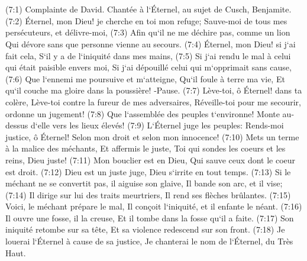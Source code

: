 \chapter{}

\verse (7:1) Complainte de David. Chantée à l`Éternel, au sujet de Cusch, Benjamite. (7:2) Éternel, mon Dieu! je cherche en toi mon refuge; Sauve-moi de tous mes persécuteurs, et délivre-moi, 
\verse (7:3) Afin qu`il ne me déchire pas, comme un lion Qui dévore sans que personne vienne au secours. 
\verse (7:4) Éternel, mon Dieu! si j`ai fait cela, S`il y a de l`iniquité dans mes mains, 
\verse (7:5) Si j`ai rendu le mal à celui qui était paisible envers moi, Si j`ai dépouillé celui qui m`opprimait sans cause, 
\verse (7:6) Que l`ennemi me poursuive et m`atteigne, Qu`il foule à terre ma vie, Et qu`il couche ma gloire dans la poussière! -Pause. 
\verse (7:7) Lève-toi, ô Éternel! dans ta colère, Lève-toi contre la fureur de mes adversaires, Réveille-toi pour me secourir, ordonne un jugement! 
\verse (7:8) Que l`assemblée des peuples t`environne! Monte au-dessus d`elle vers les lieux élevés! 
\verse (7:9) L`Éternel juge les peuples: Rends-moi justice, ô Éternel! Selon mon droit et selon mon innocence! 
\verse (7:10) Mets un terme à la malice des méchants, Et affermis le juste, Toi qui sondes les coeurs et les reins, Dieu juste! 
\verse (7:11) Mon bouclier est en Dieu, Qui sauve ceux dont le coeur est droit. 
\verse (7:12) Dieu est un juste juge, Dieu s`irrite en tout temps. 
\verse (7:13) Si le méchant ne se convertit pas, il aiguise son glaive, Il bande son arc, et il vise; 
\verse (7:14) Il dirige sur lui des traits meurtriers, Il rend ses flèches brûlantes. 
\verse (7:15) Voici, le méchant prépare le mal, Il conçoit l`iniquité, et il enfante le néant. 
\verse (7:16) Il ouvre une fosse, il la creuse, Et il tombe dans la fosse qu`il a faite. 
\verse (7:17) Son iniquité retombe sur sa tête, Et sa violence redescend sur son front. 
\verse (7:18) Je louerai l`Éternel à cause de sa justice, Je chanterai le nom de l`Éternel, du Très Haut. 

\chapter{}


